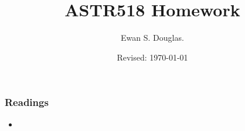 \documentclass{beamer}
\title{ASTR518  Homework}
\author{Ewan S. Douglas. }
\date{Revised: \today}
\begin{document}
\frame{\titlepage}

\frame{\tableofcontents}
\frame
{
\frametitle{Readings}
\begin{itemize}
\item 

\end{itemize}
}


\end{document}
